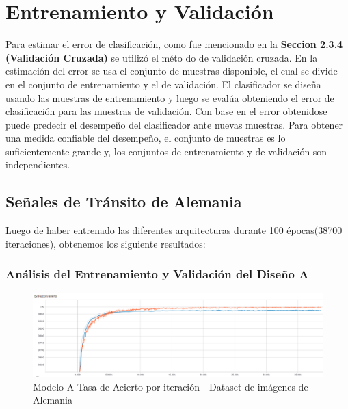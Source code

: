 \section{Entrenamiento y Validación }

	Para estimar el error de clasificación, como fue mencionado en la \textbf{Seccion 2.3.4 (Validación Cruzada)} se utilizó el méto do de validación cruzada. En la estimación del error se usa el conjunto de muestras disponible, el cual se divide en el conjunto de entrenamiento y el de validación. El clasificador se diseña usando las muestras de entrenamiento y luego se evalúa obteniendo el error de clasificación para las muestras de validación. Con base en el error obtenidose puede predecir el desempeño del clasificador ante nuevas muestras. Para obtener una medida confiable del desempeño, el conjunto de muestras es lo suficientemente grande y, los conjuntos de entrenamiento y de validación son independientes.


	\subsection{Señales de Tránsito de Alemania}

		Luego de haber entrenado las diferentes arquitecturas durante 100 épocas(38700 iteraciones), obtenemos los siguiente resultados:
	 	\subsubsection{Análisis del Entrenamiento y Validación del Diseño A}  
			\begin{figure}[H]
				\begin{center}
				\includegraphics[width=1\textwidth]{images/desarrollo/trainResults/german/model0Acierto} 
				\end{center}
				\begin{center}
				\caption{\small{Modelo A Tasa de Acierto por iteración - Dataset de imágenes de Alemania  }}
				
				{\small{\fontsize{10}{16.8}\selectfont {Fuente: Elaboración propia}}}
				\end{center}
				\vspace{-1.5em}
			\end{figure}

